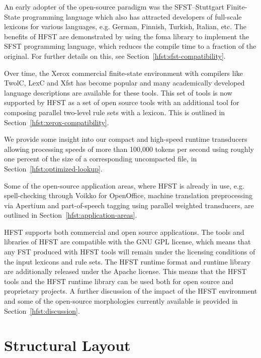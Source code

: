 \documentclass{llncs}
\begin{document}
An early adopter of the open-source paradigm was the SFST--Stuttgart Finite-State 
programming language which also has attracted developers of full-scale lexicons for 
various languages, e.g. German, Finnish, Turkish, Italian, etc. The benefits of HFST are 
demonstrated by using the foma library to implement the SFST programming language,
which reduces the compile time to a fraction of the original. For further details on this, 
see Section~\ref{hfst:sfst-compatibility}.

Over time, the Xerox commercial finite-state environment with compilers like TwolC, 
LexC and Xfst has become popular and many academically developed language 
descriptions are available for these tools. This set of tools is now supported by
HFST as a set of open source tools with an additional tool for composing parallel 
two-level rule sets with a lexicon. This is outlined in Section~\ref{hfst:xerox-compatibility}.

We provide some insight into our compact and high-speed runtime transducers allowing 
processing speeds of more than 100,000 tokens per second using roughly one percent of 
the size of a corresponding uncompacted file, in Section~\ref{hfst:optimized-lookup}. 

Some of the open-source application areas, where HFST is already in use, e.g. 
spell-checking through Voikko for OpenOffice, machine translation preprocessing via Apertium 
and part-of-speech tagging using parallel weighted transducers, are outlined in Section~\ref{hfst:application-areas}.

HFST supports both commercial and open source applications. The tools and libraries of HFST are
compatible with the GNU GPL license, which means that any FST produced with HFST tools will 
remain under the licensing conditions of the input lexicons and rule sets. The HFST runtime
format and runtime library are additionally released under the Apache license. This means that the
HFST tools and the HFST runtime library can be used both for open source and proprietary projects.
A further discussion of the impact of the HFST environment and some of the open-source 
morphologies currently available is provided in Section~\ref{hfst:discussion}.


\section{Structural Layout}\label{hfst:structural-layout}
\end{document}
